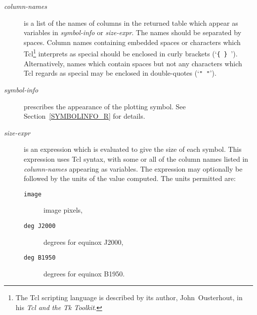 \documentclass[twoside,11pt,nolof,chapters]{starlink}
\begin{document}
\begin{description}

  \item[\textit{column-names}] is a list of the names of columns in the
   returned table which appear as variables in \textit{symbol-info}\/ or
   \textit{size-expr}.  The names should be separated by spaces.  Column
   names containing embedded spaces or characters which Tcl\footnote{The
   Tcl scripting language is described by its author, John~Ousterhout, in
   his \textit{Tcl and the Tk Toolkit}\/\cite{OUSTERHOUT94}.} interprets as
   special should be enclosed in curly brackets (`\texttt{\{ \} }').
   Alternatively, names which contain spaces but not any characters
   which Tcl regards as special may be enclosed in double-quotes
   (`\texttt{" "}').

  \item[\textit{symbol-info}] prescribes the appearance of the plotting
   symbol.  See Section~\ref{SYMBOLINFO_R} for details.

  \item[\textit{size-expr}] is an expression which is evaluated to give the
   size of each symbol.  This expression uses Tcl syntax, with some or
   all of the column names listed in \textit{column-names}\/ appearing as
   variables.  The expression may optionally be followed by the units
   of the value computed.  The units permitted are:

  \begin{description}

    \item[\texttt{image}] image pixels,

    \item[\texttt{deg J2000}] degrees for equinox J2000,

    \item[\texttt{deg B1950}] degrees for equinox B1950.

  \end{description}

\end{description}
\end{document}
